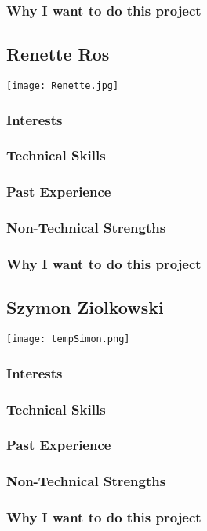 \subsubsection{Why I want to do this project}


\subsection{Renette Ros}
\texttt{[image: Renette.jpg]}

\subsubsection{Interests}
\subsubsection{Technical Skills}
\subsubsection{Past Experience}
\subsubsection{Non-Technical Strengths}
\subsubsection{Why I want to do this project}

\subsection{Szymon Ziolkowski}
\texttt{[image: tempSimon.png]}

\subsubsection{Interests}
\subsubsection{Technical Skills}
\subsubsection{Past Experience}
\subsubsection{Non-Technical Strengths}
\subsubsection{Why I want to do this project}

